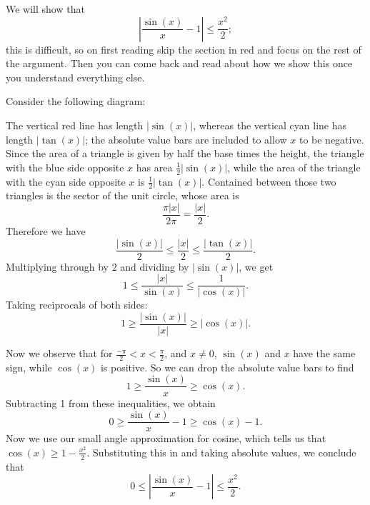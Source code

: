 \documentclass{article}
\begin{document}
We will show that
\[\left|\frac{\sin(x)}{x}-1\right|\leq\frac{x^2}{2};\]
this is difficult, so on first reading skip the section in red and focus on the rest of the argument. Then you can come back and read about how we show this once you understand everything else.\medskip

{\color{red}


Consider the following diagram:


\begin{center}
\end{center}

The vertical red line has length $|\sin(x)|$, whereas the vertical cyan line has length $|\tan(x)|$; the absolute value bars are included to allow $x$ to be negative. Since the area of a triangle is given by half the base times the height, the triangle with the blue side opposite $x$ has area $\frac{1}{2}|\sin(x)|$, while the area of the triangle with the cyan side opposite $x$ is $\frac{1}{2}|\tan(x)|$. Contained between those two triangles is the sector of the unit circle, whose area is
\[\frac{\pi |x|}{2\pi}=\frac{|x|}{2}.\]
Therefore we have
\[\frac{|\sin(x)|}{2}\leq \frac{|x|}{2}\leq \frac{|\tan(x)|}{2}.\]
Multiplying through by $2$ and dividing by $|\sin(x)|$, we get
\[1\leq \frac{|x|}{\sin(x)}\leq \frac{1}{|\cos(x)|}.\]
Taking reciprocals of both sides:
\[1\geq \frac{|\sin(x)|}{|x|}\geq|\cos(x)|.\]

Now we observe that for $\frac{-\pi}{2}<x<\frac{\pi}{2}$, and $x\neq 0$, $\sin(x)$ and $x$ have the same sign, while $\cos(x)$ is positive. So we can drop the absolute value bars to find
\[1\geq\frac{\sin(x)}{x}\geq\cos(x).\]
Subtracting 1 from these inequalities, we obtain
\[0\geq \frac{\sin(x)}{x}-1\geq\cos(x)-1.\]
Now we use our small angle approximation for cosine, which tells us that $\cos(x)\geq 1-\frac{x^2}{2}$. Substituting this in and taking absolute values, we conclude that
\[0\leq \left|\frac{\sin(x)}{x}-1\right|\leq\frac{x^2}{2}.\]
}
\end{document}
